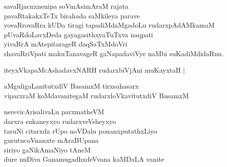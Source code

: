 \begin{entry}
\gl{}
\begin{shl}
savaRjacnxnenipa soVmAsimAraM rajata\\
pavaRtakakxTeTx birahada saMkileya parave\\
yovaRrovaRra kUDa tiragi tapadiMdaMgadoLu rudarxpAdAMkamaM\\
pUvaRdoLavxDeda gayagasithxyaTuTxva naqpati\\
yivaRrA mAtepitarageR daqSaTxMdoVri\\
shavaRriVpati makuTanavageR gaNapadaviVye naMbi suKadiMdidaRnu.
\end{shl}
\end{entry}

\begin{entry}
\begin{shl}
iteyxVkapaMcAshadavxNARH rudarxbiVjAni muKayxtaH |
\end{shl}
\end{entry}

\begin{entry}
\end{entry}

\begin{entry}
\end{entry}

\begin{entry}
\gl{}
\begin{shl}
aMguligaLanitutxdiV BasamxM tirxsahasarx\\
viparxraM koMdavanitegaM rudarxloVkavitutxdiV BasamxM
\end{shl}
\end{entry}

\begin{entry}
\gl{}
\begin{shl}
nerevicArisalivaLu parxmatheVM\\
darxra sukaneyxyo rudarxveVsheyxyo\\
taruNi citarxda rUpo noVDalu ponanxputathxLiyo\\
gurutucoVnanxte mAraBUpana\\
siriyo gaNikAmaNiyo tAneM\\
dure nuDiva GanamugadhxdeVvana kaMDaLA vanite
\end{shl}
\end{entry}

